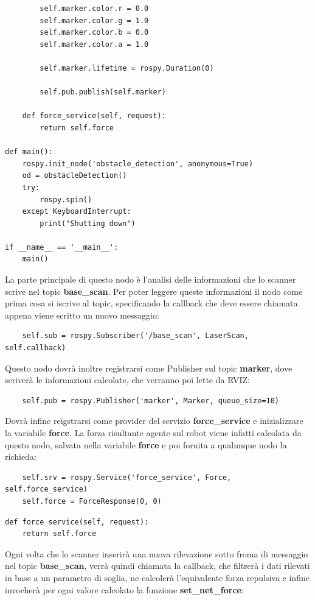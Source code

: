 \documentclass[Lau, binding=0.6cm, oneside]{sapthesis}
\begin{document}
\begin{lstlisting}
        self.marker.color.r = 0.0
        self.marker.color.g = 1.0
        self.marker.color.b = 0.0
        self.marker.color.a = 1.0

        self.marker.lifetime = rospy.Duration(0)

        self.pub.publish(self.marker)

    def force_service(self, request):
        return self.force

def main():
    rospy.init_node('obstacle_detection', anonymous=True)
    od = obstacleDetection()
    try:
        rospy.spin()
    except KeyboardInterrupt:
        print("Shutting down")

if __name__ == '__main__':
    main()
\end{lstlisting}

La parte principale di questo nodo è l'analisi delle informazioni che lo scanner scrive nel topic \textbf{base\_scan}.
Per poter leggere queste informazioni il nodo come prima cosa si iscrive al topic, specificando la callback che deve essere chiamata appena viene scritto un nuovo messaggio:

\begin{lstlisting}
	self.sub = rospy.Subscriber('/base_scan', LaserScan, self.callback)
\end{lstlisting}

Questo nodo dovrà inoltre registrarsi come Publisher sul topic \textbf{marker}, dove scriverà le informazioni calcolate, che verranno poi lette da RVIZ:

\begin{lstlisting}
    self.pub = rospy.Publisher('marker', Marker, queue_size=10)
\end{lstlisting}

Dovrà infine reigstrarsi come provider del servizio \textbf{force\_service} e inizializzare la variabile \textbf{force}.
La forza risultante agente sul robot viene infatti calcolata da questo nodo, salvata nella variabile \textbf{force} e poi fornita a qualunque nodo la richieda:

\begin{lstlisting}
    self.srv = rospy.Service('force_service', Force, self.force_service)
    self.force = ForceResponse(0, 0)
\end{lstlisting}

\begin{lstlisting}
def force_service(self, request):
    return self.force
\end{lstlisting}

Ogni volta che lo scanner inserirà una nuova rilevazione sotto froma di messaggio nel topic \textbf{base\_scan}, verrà quindi chiamata la callback, che filtrerà i dati rilevati in base a un parametro di soglia, ne calcolerà l'equivalente forza repulsiva e infine invocherà per ogni valore calcolato la funzione \textbf{set\_net\_force}:
\end{document}
